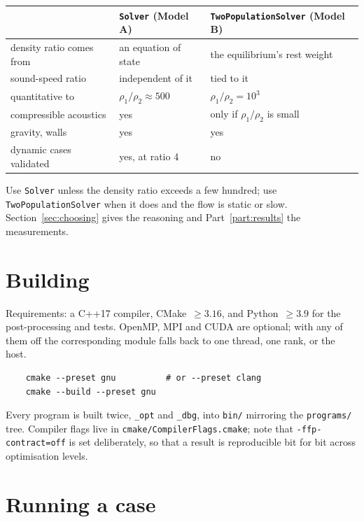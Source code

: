 \documentclass[11pt,a4paper]{article}
\theoremstyle{plain}
\theoremstyle{definition}
\begin{document}
\begin{center}\small
\begin{tabular}{lll}
\toprule
& \texttt{Solver} (Model A) & \texttt{TwoPopulationSolver} (Model B) \\
\midrule
density ratio comes from & an equation of state & the equilibrium's rest weight \\
sound-speed ratio        & independent of it    & tied to it \\
quantitative to          & $\rho_1/\rho_2 \approx 500$ & $\rho_1/\rho_2 = 10^3$ \\
compressible acoustics   & yes                  & only if $\rho_1/\rho_2$ is small \\
gravity, walls           & yes                  & yes \\
dynamic cases validated  & yes, at ratio 4      & no \\
\bottomrule
\end{tabular}
\end{center}

\noindent
Use \texttt{Solver} unless the density ratio exceeds a few hundred; use
\texttt{TwoPopulationSolver} when it does and the flow is static or slow.
Section~\ref{sec:choosing} gives the reasoning and Part~\ref{part:results} the
measurements.

\section{Building}

Requirements: a C++17 compiler, CMake~$\ge 3.16$, and Python~$\ge 3.9$ for the
post-processing and tests. OpenMP, MPI and CUDA are optional; with any of them
off the corresponding module falls back to one thread, one rank, or the host.

\begin{verbatim}
    cmake --preset gnu          # or --preset clang
    cmake --build --preset gnu
\end{verbatim}

Every program is built twice, \texttt{\_opt} and \texttt{\_dbg}, into
\texttt{bin/} mirroring the \texttt{programs/} tree. Compiler flags live in
\texttt{cmake/CompilerFlags.cmake}; note that \texttt{-ffp-contract=off} is set
deliberately, so that a result is reproducible bit for bit across optimisation
levels.

\section{Running a case}
\end{document}
